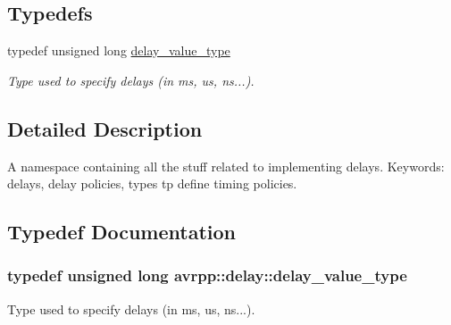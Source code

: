 \subsection*{Typedefs}
\begin{DoxyCompactItemize}
\item 
typedef unsigned long \hyperlink{namespaceavrpp_1_1delay_a64f093ce9e68cc79894a8549286594f0}{delay\_\-value\_\-type}
\begin{DoxyCompactList}\small\item\em Type used to specify delays (in ms, us, ns...). \item\end{DoxyCompactList}\end{DoxyCompactItemize}


\subsection{Detailed Description}
A namespace containing all the stuff related to implementing delays. Keywords: delays, delay policies, types tp define timing policies. 

\subsection{Typedef Documentation}
\hypertarget{namespaceavrpp_1_1delay_a64f093ce9e68cc79894a8549286594f0}{
\subsubsection[{delay\_\-value\_\-type}]{\setlength{\rightskip}{0pt plus 5cm}typedef unsigned long {\bf avrpp::delay::delay\_\-value\_\-type}}}
\label{namespaceavrpp_1_1delay_a64f093ce9e68cc79894a8549286594f0}


Type used to specify delays (in ms, us, ns...). 

